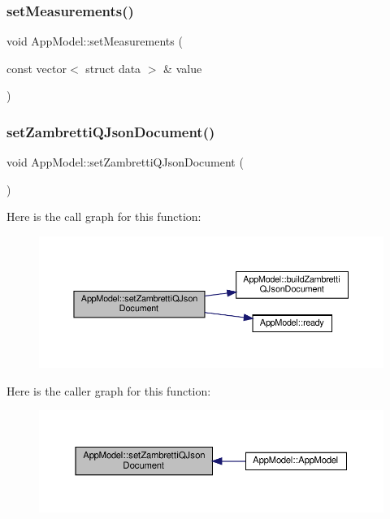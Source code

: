 \subsubsection{\texorpdfstring{set\+Measurements()}{setMeasurements()}}
{\footnotesize\ttfamily void App\+Model\+::set\+Measurements (\begin{DoxyParamCaption}\item[{const vector$<$ struct data $>$ \&}]{value }\end{DoxyParamCaption})}

\mbox{\label{class_app_model_a18bdf8b2328b6d64e2315b5e8027f07e}} 
\subsubsection{\texorpdfstring{set\+Zambretti\+Q\+Json\+Document()}{setZambrettiQJsonDocument()}}
{\footnotesize\ttfamily void App\+Model\+::set\+Zambretti\+Q\+Json\+Document (\begin{DoxyParamCaption}{ }\end{DoxyParamCaption})}

Here is the call graph for this function\+:\nopagebreak
\begin{figure}[H]
\begin{center}
\leavevmode
\includegraphics[width=350pt]{class_app_model_a18bdf8b2328b6d64e2315b5e8027f07e_cgraph}
\end{center}
\end{figure}
Here is the caller graph for this function\+:\nopagebreak
\begin{figure}[H]
\begin{center}
\leavevmode
\includegraphics[width=350pt]{class_app_model_a18bdf8b2328b6d64e2315b5e8027f07e_icgraph}
\end{center}
\end{figure}
\mbox{\label{class_app_model_ad4f010e1e4244d90cd648c6806dcda4e}} 
